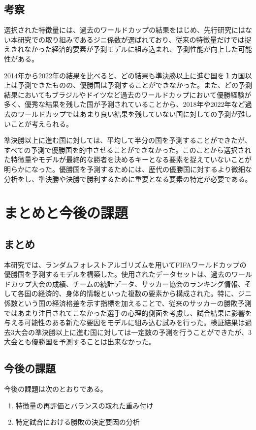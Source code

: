 \documentclass[platex]{suribt}
\begin{document}
\section{考察}
選択された特徴量には、過去のワールドカップの結果をはじめ、先行研究にはない本研究での取り組みであるジニ係数が選ばれており、従来の特徴量だけでは捉えきれなかった経済的要素が予測モデルに組み込まれ、予測性能が向上した可能性がある。

2014年から2022年の結果を比べると、どの結果も準決勝以上に進む国を１カ国以上は予測できたものの、優勝国は予測することができなかった。また、どの予測結果においてもブラジルやドイツなど過去のワールドカップにおいて優勝経験が多く、優秀な結果を残した国が予測されていることから、2018年や2022年など過去のワールドカップではあまり良い結果を残していない国に対しての予測が難しいことが考えられる。

準決勝以上に進む国に対しては、平均して半分の国を予測することができたが、すべての予測で優勝国を的中させることができなかった。このことから選択された特徴量やモデルが最終的な勝者を決めるキーとなる要素を捉えていないことが明らかになった。優勝国を予測するためには、歴代の優勝国に対するより微細な分析をし、準決勝や決勝で勝利するために重要となる要素の特定が必要である。

\chapter{まとめと今後の課題}

\section{まとめ}
本研究では、ランダムフォレストアルゴリズムを用いてFIFAワールドカップの優勝国を予測するモデルを構築した。使用されたデータセットは、過去のワールドカップ大会の成績、チームの統計データ、サッカー協会のランキング情報、そして各国の経済的、身体的情報といった複数の要素から構成された。特に、ジニ係数という国の経済格差を示す指標を加えることで、従来のサッカーの勝敗予測ではあまり注目されてこなかった選手の心理的側面を考慮し、試合結果に影響を与える可能性のある新たな要因をモデルに組み込む試みを行った。検証結果は過去3大会の準決勝以上に進む国に対しては一定数の予測を行うことができたが、3大会とも優勝国を予測することは出来なかった。
\section{今後の課題}
今後の課題は次のとおりである。

\begin{enumerate}
  \item 特徴量の再評価とバランスの取れた重み付け
  \item 特定試合における勝敗の決定要因の分析
\end{enumerate}
\end{document}
